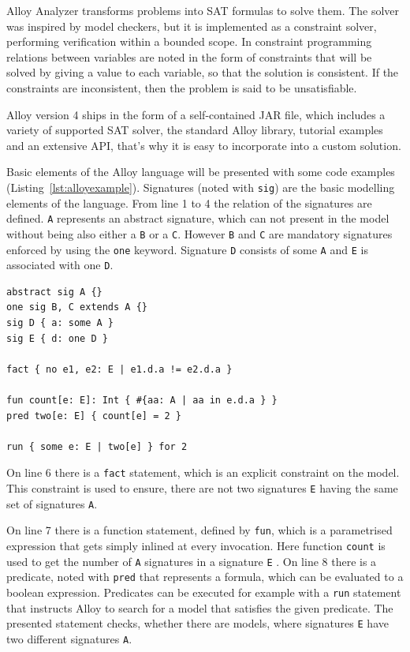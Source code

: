 Alloy Analyzer transforms problems into SAT formulas to solve them. The solver was inspired by model checkers, but it is implemented as a constraint solver, performing verification within a bounded scope. In constraint programming relations between variables are noted in the form of constraints that will be solved by giving a value to each variable, so that the solution is consistent. If the constraints are inconsistent, then the problem is said to be unsatisfiable.

Alloy version 4 ships in the form of a self-contained JAR file, which includes a variety of supported SAT solver, the standard Alloy library, tutorial examples and an extensive API, that's why it is easy to incorporate into a custom solution.

Basic elements of the Alloy language will be presented with some code examples (Listing~\ref{lst:alloyexample}). Signatures (noted with \texttt{sig}) are the basic modelling elements of the language. From line 1 to 4 the relation of the signatures are defined. \texttt{A} represents an abstract signature, which can not present in the model without being also either a \texttt{B} or a \texttt{C}. However \texttt{B} and \texttt{C} are mandatory signatures enforced by using the \texttt{one} keyword. Signature \texttt{D} consists of some \texttt{A} and \texttt{E} is associated with one \texttt{D}.

\begin{lstlisting}[label={lst:alloyexample}, caption=Example Alloy code,breaklines=true]
abstract sig A {}
one sig B, C extends A {}
sig D { a: some A }
sig E { d: one D }

fact { no e1, e2: E | e1.d.a != e2.d.a }

fun count[e: E]: Int { #{aa: A | aa in e.d.a } }
pred two[e: E] { count[e] = 2 }

run { some e: E | two[e] } for 2
\end{lstlisting}

On line 6 there is a \texttt{fact} statement, which is an explicit constraint on the model. This constraint is used to ensure, there are not two signatures \texttt{E} having the same set of signatures \texttt{A}. 

On line 7 there is a function statement, defined by \texttt{fun}, which is a parametrised expression that gets simply inlined at every invocation. Here function \texttt{count} is used to get the number of \texttt{A} signatures in a signature \texttt{E} . On line 8 there is a predicate, noted with \texttt{pred} that represents a formula, which can be evaluated to a boolean expression. Predicates can be executed for example with a \texttt{run} statement that instructs Alloy to search for a model that satisfies the given predicate. The presented statement checks, whether there are models, where signatures \texttt{E} have two different signatures \texttt{A}.

